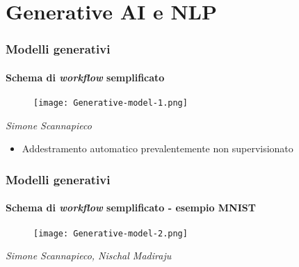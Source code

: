 \section{Generative AI e NLP}
\label{sec:genai_nlp}
%
\begin{frame}[t] \frametitle{Modelli generativi}
\framesubtitle{Schema di \emph{workflow} semplificato}
	\begin{minipage}[t]{\textwidth}
		\vspace{-.7cm}
		\begin{figure}
			\centering
			\texttt{[image: Generative-model-1.png]}
		\end{figure}
        \begin{flushright}
            \vspace*{-10pt}
            {\tiny\textit{\textcopyright Simone Scannapieco}}
        \end{flushright}
		\vspace{-.3cm}
		\begin{itemize}[leftmargin=10pt,align=right]
			\item[\alert{\faArrowCircleRight}] Addestramento automatico prevalentemente \alert{non supervisionato}
		\end{itemize}
	\end{minipage}
\end{frame}
%
\begin{frame}[t] \frametitle{Modelli generativi}
\framesubtitle{Schema di \emph{workflow} semplificato - esempio MNIST}
{\footnotesize
	\begin{minipage}[t]{\textwidth}
		\vspace{-.7cm}
		\begin{figure}
			\centering
			\texttt{[image: Generative-model-2.png]}
		\end{figure}
		\begin{flushright}
			 \vspace*{-10pt}
            {\tiny\textit{\textcopyright Simone Scannapieco, Nischal Madiraju}}
		\end{flushright}
	\end{minipage}
}
\end{frame}
%

